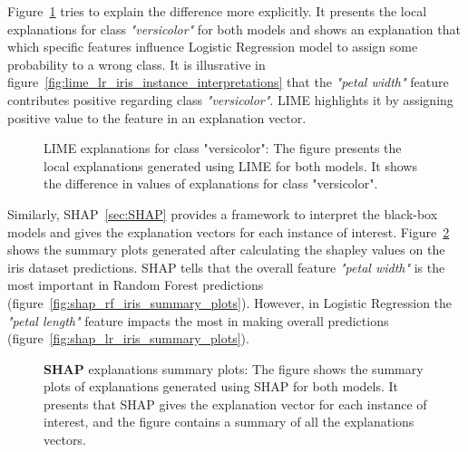 \documentclass[english]{tktltiki2}
\theoremstyle{definition}
\theoremstyle{remark}
\begin{document}
Figure~\ref{fig:lime_iris_instance_interpretations} tries to explain the difference more explicitly. It presents the local explanations for class \textit{"versicolor"}
for both models and shows an explanation that which specific features influence Logistic Regression model to assign some probability to a wrong class. It is illusrative in figure~\ref{fig:lime_lr_iris_instance_interpretations} that the \textit{"petal width"} feature contributes positive regarding class \textit{"versicolor"}. LIME highlights it by assigning positive value to the feature in an explanation vector.
\begin{figure}[H]
	\vspace*{0mm}
	\centering
	\qquad
	\caption{LIME explanations for class "versicolor": The figure presents the local explanations generated using LIME for both models. It shows the difference in values of explanations for class "versicolor".}%
	\label{fig:lime_iris_instance_interpretations}%
\end{figure}


Similarly, SHAP~\ref{sec:SHAP} provides a framework to interpret the black-box models and gives the explanation vectors for each instance of interest. Figure~\ref{fig:shap_iris_summary_plots} shows the summary plots generated after calculating the shapley values on the iris dataset predictions. SHAP tells that the overall feature \textit{"petal width"} is the most important in Random Forest predictions (figure~\ref{fig:shap_rf_iris_summary_plots}). However, in Logistic Regression the \textit{"petal length"} feature impacts the most in making overall predictions (figure~\ref{fig:shap_lr_iris_summary_plots}). 
\begin{figure}[H]
	\vspace*{0mm}
	\centering
	\qquad
	\caption{\textbf{SHAP} explanations summary plots: The figure shows the summary plots of explanations generated using SHAP for both models. It presents that SHAP gives the explanation vector for each instance of interest, and the figure contains a summary of all the explanations vectors.}%
	\label{fig:shap_iris_summary_plots}%
\end{figure}
\end{document}

